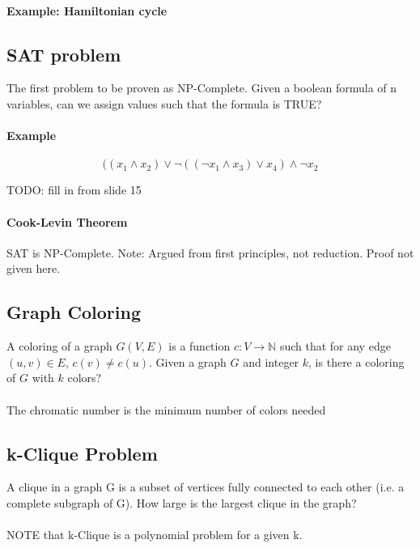 \documentclass[a4paper]{article}
\begin{document}
\paragraph{Example: Hamiltonian cycle}

\subsection{SAT problem}
The first problem to be proven as NP-Complete. Given a boolean formula of n variables, can we assign values such that the formula is TRUE?

\paragraph{Example}
\[((x_1 \land x_2) \lor \lnot ((\lnot x_1 \land x_3) \lor x_4) \land \lnot x_2 \]

TODO: fill in from slide 15

\paragraph{Cook-Levin Theorem}
SAT is NP-Complete. Note: Argued from first principles, not reduction. Proof not given here.

\subsection{Graph Coloring}
A coloring of a graph $G(V,E)$ is a function $c:V\to \mathbb{N}$ such that for any edge $(u,v)\in E$, $c(v)\ne c(u)$. Given a graph $G$ and integer $k$, is there a coloring of $G$ with $k$ colors?

\paragraph{}
The chromatic number is the minimum number of colors needed


\subsection{k-Clique Problem}
A clique in a graph G is a subset of vertices fully connected to each other (i.e. a complete subgraph of G). How large is the largest clique in the graph?

\paragraph{}
NOTE that k-Clique is a polynomial problem for a given k.
\end{document}
